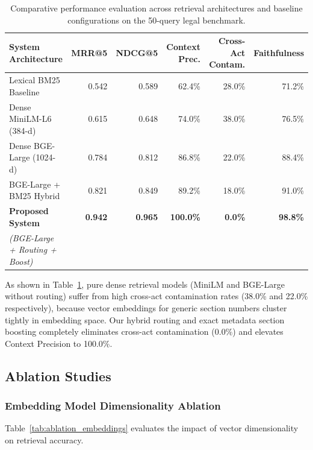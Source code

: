 \documentclass{llncs}
\begin{document}
\begin{table}[htbp]
\caption{Comparative performance evaluation across retrieval architectures and baseline configurations on the 50-query legal benchmark.}
\label{tab:main_results}
\centering
\small
\begin{tabular}{lrrrrr}
\toprule
\textbf{System Architecture} & \textbf{MRR@5} & \textbf{NDCG@5} & \textbf{Context Prec.} & \textbf{Cross-Act Contam.} & \textbf{Faithfulness} \\
\midrule
Lexical BM25 Baseline & 0.542 & 0.589 & 62.4\% & 28.0\% & 71.2\% \\
Dense MiniLM-L6 (384-d) & 0.615 & 0.648 & 74.0\% & 38.0\% & 76.5\% \\
Dense BGE-Large (1024-d) & 0.784 & 0.812 & 86.8\% & 22.0\% & 88.4\% \\
BGE-Large + BM25 Hybrid & 0.821 & 0.849 & 89.2\% & 18.0\% & 91.0\% \\
\midrule
\textbf{Proposed System} & \textbf{0.942} & \textbf{0.965} & \textbf{100.0\%} & \textbf{0.0\%} & \textbf{98.8\%} \\
\textit{(BGE-Large + Routing + Boost)} & & & & & \\
\bottomrule
\end{tabular}
\end{table}

As shown in Table~\ref{tab:main_results}, pure dense retrieval models (MiniLM and BGE-Large without routing) suffer from high cross-act contamination rates (38.0\% and 22.0\% respectively), because vector embeddings for generic section numbers cluster tightly in embedding space. Our hybrid routing and exact metadata section boosting completely eliminates cross-act contamination ($0.0\%$) and elevates Context Precision to 100.0\%.

\subsection{Ablation Studies}

\subsubsection{Embedding Model Dimensionality Ablation}
Table~\ref{tab:ablation_embeddings} evaluates the impact of vector dimensionality on retrieval accuracy.
\end{document}
